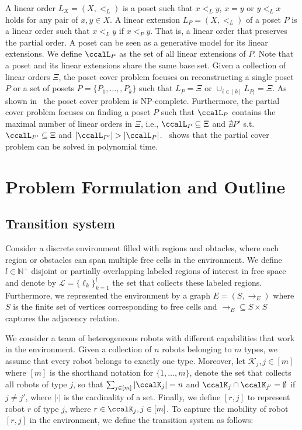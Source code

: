 \documentclass[Afour,sageh,times]{sagej}
\begin{document}
A linear order $L_X=(X, <_L)$ is a poset such that $x <_L y$, $x = y$ or $y <_L x$ holds for any pair of  $x, y \in X$. A linear extension  $L_P = (X, <_L)$ of a poset $P$ is a linear order such that $x <_L y$ if $x <_P y$. That is, a linear order that preserves the partial order. A poset can be seen as a generative model for its linear extensions.
We define $\ccalL_P$ as the set of all linear extensions of $P$. Note that a poset and its linear extensions share the same base set. Given a collection of linear orders $\Xi$, the poset cover problem focuses on reconstructing a single poset $P$ or a set of posets $P = \{P_1,\ldots,,P_k\}$ such that $L_P = \Xi$ or $\cup_{i\in[k]}L_{P_i} = \Xi$. As shown in~\cite{heath2013poset} the poset cover problem is NP-complete. Furthermore, the partial cover problem focuses on finding a poset $P$ such that $\ccalL_P$ contains the maximal number of linear orders in $\Xi$, i.e., $\ccalL_P \subseteq \Xi$ and   $\nexists P'$ s.t. $\ccalL_{P'} \subseteq \Xi$ and $|\ccalL_{P'}| > |\ccalL_{P}|$.~\cite{heath2013poset} shows that the partial cover problem can be solved in polynomial time.



\section{Problem Formulation and Outline}\label{sec:problem}
\subsection{Transition system}\label{sec:ts}
 Consider a discrete environment filled with regions and obtacles, where each region or obstacles can span multiple free cells in the environment. We define $l\in \mathbb{N}^+$ disjoint or partially overlapping labeled regions of interest in free space and denote by $\mathcal{L}=\{\ell_k\}_{k=1}^{l}$ the set that collects these labeled regions. Furthermore, we represented the environment by a graph $E = (S, \to_E)$ where $S$ is the finite set of vertices corresponding to free cells and $\to_{E} \subseteq S \times S$ captures the adjacency relation.

 We consider a team of heterogeneous robots with different capabilities that work in the environment. Given a collection of $n$ robots belonging to $m$ types, we assume that every robot belongs to exactly one type. Moreover, let $\mathcal{K}_j, j\in[m]$ where $[m]$ is the shorthand notation for  $\{1,\ldots,m\}$, denote the set that  collects all robots of type $j$, so that $\sum_{j\in [m]} |\ccalK_j| = n$ and $\ccalK_{j} \cap \ccalK_{j'} = \emptyset$ if $j \not= j'$, where $|\cdot|$ is the cardinality of a set. Finally, we define $[r,j]$ to represent robot $r$ of type $j$, where $r\in \ccalK_j, j\in [m]$. To capture the mobility of robot $[r,j]$ in the environment, we define the { transition system} as follows:
\end{document}
